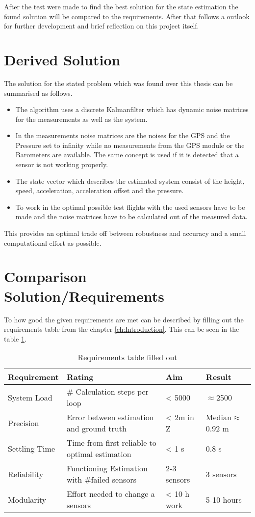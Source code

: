 After the test were made to find the best solution for the state estimation
the found solution will be compared to the requirements.
After that follows a outlook for further development and brief reflection on this project itself.

\section{Derived Solution}
The solution for the stated problem which was found over this thesis can be summarised as follows.
\begin{itemize}
 \item The algorithm uses a discrete Kalmanfilter which has dynamic noise matrices for the measurements as well as the system.
 \item In the measurements noise matrices are the noises for the GPS and the Pressure set to infinity while no measurements from the GPS module or the Barometers are available.
The same concept is used if it is detected that a sensor is not working properly.
 \item The state vector which describes the estimated system consist of the height, speed, acceleration, acceleration offset and the pressure.
 \item To work in the optimal possible test flights with the used sensors have to be made and the noise matrices have to be calculated out of the measured data.
\end{itemize}

This provides an optimal trade off between robustness and accuracy and a small computational effort as possible.

\section{Comparison Solution/Requirements}
To how good the given requirements are met can be described by filling out the requirements table from the chapter \ref{ch:Introduction}.
This can be seen in the table \ref{tab:RequirementsFilledOut}.

 \begin{table}[h]
 \centering
 \begin{tabular}{|l|l|l|l|}	
 \hline	
 \bf{Requirement}   & \bf{Rating} & \bf{Aim} & \bf{Result} \\ \hline
 System Load   & \# Calculation steps per loop & < 5000 & $\approx$2500 \\ \hline
 Precision     & Error between estimation and ground truth  & < 2m in Z & Median$\approx$ 0.92 m  \\ \hline
 Settling Time & Time from first reliable to optimal estimation  & < 1 s &  0.8 s \\ \hline
 Reliability   & Functioning Estimation with \#failed sensors & 2-3 sensors & 3 sensors \\ \hline	
 Modularity    & Effort needed to change a sensors & < 10 h work &  5-10 hours \\ \hline
 \end{tabular}	
 \caption{Requirements table filled out}
 \label{tab:RequirementsFilledOut}
 \end{table}
 
